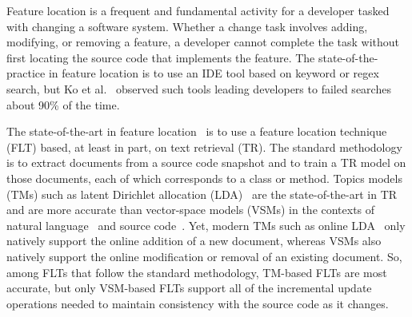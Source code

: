
Feature location is a frequent and fundamental activity for a developer tasked with changing a software system.
Whether a change task involves adding, modifying, or removing a feature, a developer cannot complete the task without first locating the source code that implements the feature.
The state-of-the-practice in feature location is to use an IDE tool based on keyword or regex search, but Ko et al.~\cite{Ko-etal:2006} observed such tools leading developers to failed searches about 90\% of the time.

The state-of-the-art in feature location~\cite{Dit-etal:2011} is to use a feature location technique (FLT) based, at least in part, on text retrieval (TR).
The standard methodology~\cite{Marcus-etal:04} is to extract documents from a source code snapshot and to train a TR model on those documents, each of which corresponds to a class or method.
Topics models (TMs) such as latent Dirichlet allocation (LDA)~\cite{Blei-etal:03} are the state-of-the-art in TR~\cite{Blei:ACM:Communications} and are more accurate than vector-space models (VSMs) in the contexts of natural language~\cite{} and source code~\cite{}.
Yet, modern TMs such as online LDA~\cite{} only natively support the online addition of a new document, whereas VSMs also natively support the online modification or removal of an existing document.
So, among FLTs that follow the standard methodology, TM-based FLTs are most accurate, but only VSM-based FLTs support all of the incremental update operations needed to maintain consistency with the source code as it changes.

\begin{comment}
despite the accuracy improvements offered by lda and the potential for further improvement offered by the tm research community

Complete retraining of a TR model can be computationally expensive, particularly for a large software system.
Therefore, an FLT that requires complete retraining in response to source code changes is not a viable option for inclusion in an IDE.
However, while many online TR models permit continual addition of new documents, few permit modification or removal of existing documents.
In particular, of the TR models on which FLTs from the literature are based, only VSMs permit incremental retraining in cases of modification to or removal of an existing document,
whereas LSI and LDA limit incremental retraining to cases of addition of a new document.
Because studies indicate that LSI and LDA are superior to a VSM, both in general~\cite{} and in the context of source code search~\cite{},
Rao~\cite{Rao:2013} extended LSI and LDA as part of an incremental FLT framework that requires complete retraining only periodically.
Although the framework reduces retraining costs, it does not eliminate them completely, and it does not accept new TR models off the shelf (without extension).

Fresh take\ldots

Contributions\ldots
\end{comment}




